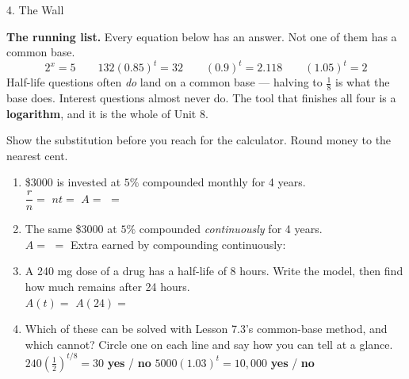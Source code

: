 \documentclass[10pt]{article}
\begin{document}
\begin{notesbox}{4. The Wall}
\vspace{3pt}
\begin{tcolorbox}[colback=redbg, colframe=redacc, boxrule=0.8pt, arc=1.5mm,
    left=2.5mm, right=2.5mm, top=1.5mm, bottom=1.5mm]
\textbf{The running list.} Every equation below has an answer. Not one of them has a common base.
\[
  2^{x}=5 \qquad 132(0.85)^{t}=32 \qquad (0.9)^{t}=2.118 \qquad (1.05)^{t}=2
\]
Half-life questions often \emph{do} land on a common base --- halving to $\frac18$ is what the base
does. Interest questions almost never do. The tool that finishes all four is a \textbf{logarithm}, and
it is the whole of Unit 8.
\end{tcolorbox}
\end{notesbox}

\begin{practicebox}
Show the substitution before you reach for the calculator. Round money to the nearest cent.
\begin{enumerate}[leftmargin=1.7em, itemsep=5pt]
  \item \$3000 is invested at $5\%$ compounded monthly for 4 years. \\[2pt]
        $\dfrac{r}{n}=$  \quad $nt=$  \quad
        $A=$  $=$ 

  \item The same \$3000 at $5\%$ compounded \emph{continuously} for 4 years. \\[2pt]
        $A=$  $=$  \quad Extra earned by compounding continuously:

  \item A 240 mg dose of a drug has a half-life of 8 hours. Write the model, then find how much
        remains after 24 hours. \\[2pt]
        $A(t)=$  \hfill $A(24)=$ 

  \item Which of these can be solved with Lesson 7.3's common-base method, and which cannot? Circle
        one on each line and say how you can tell at a glance.
        \\[2pt]
        \hspace*{1.0em} $240\left(\frac12\right)^{t/8}=30$ \quad \textcolor{keyred}{\textbf{yes}} / \textbf{no}
        \hfill
        $5000(1.03)^{t}=10{,}000$ \quad \textbf{yes} / \textcolor{keyred}{\textbf{no}}
        \\[2pt]
\end{enumerate}
\end{practicebox}
\end{document}
